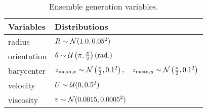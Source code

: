 \begin{table}[htbp]
    \centering
    \caption{Ensemble generation variables.}
    \begin{tabular}{|l|l|}
        \hline
        Variables   & Distributions                                                                                                           \\
        \hline
        radius      & $R \sim \mathcal N(1.0, 0.05^2)$                                                                                               \\
        orientation & $\theta \sim \mathcal U\left(\pi, \frac\pi2 \right) (\text{rad.}) $                                                            \\
        barycenter  & $z_{\text{mean},x} \sim \mathcal N\left(\frac\pi2,0.1^2\right), \quad z_{\text{mean},y} \sim \mathcal N\left(\frac\pi2,0.1^2\right) $ \\
        velocity    & $U \sim \mathcal U(0, 0.5^2) $                                                                                                 \\
        viscosity   & $v \sim \mathcal N(0.0015, 0.0005^2)$                                                                                          \\
        \hline
    \end{tabular}
    \label{tab:ens_dipole}
\end{table}

\newpage